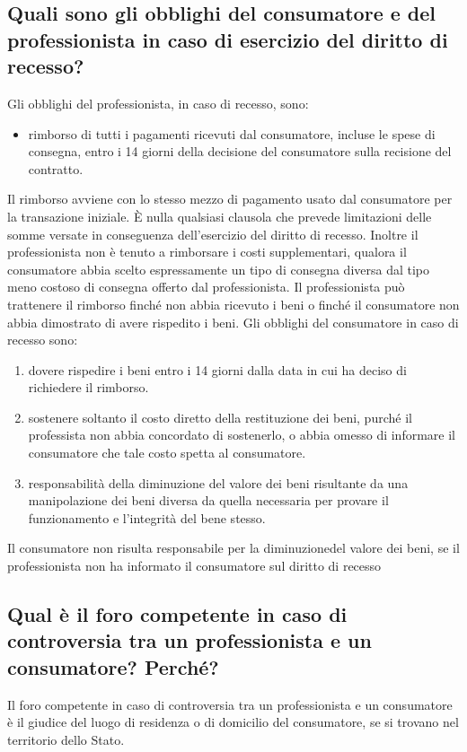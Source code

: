 \subsection{Quali sono gli obblighi del consumatore e del professionista in caso di
esercizio del diritto di recesso?}
Gli obblighi del professionista, in caso di recesso, sono:
\begin{itemize}
    \item rimborso di tutti i pagamenti ricevuti dal consumatore, incluse le spese di
        consegna, entro i 14 giorni della decisione del consumatore sulla recisione del
        contratto.
\end{itemize}
Il rimborso avviene con lo stesso mezzo di pagamento usato dal consumatore per la
transazione iniziale.
È nulla qualsiasi clausola che prevede limitazioni delle somme versate in conseguenza
dell'esercizio del diritto di recesso.
Inoltre il professionista non è tenuto a rimborsare i costi supplementari, qualora il
consumatore abbia scelto espressamente un tipo di consegna diversa dal tipo meno costoso
di consegna offerto dal professionista.
Il professionista può trattenere il rimborso finché non abbia ricevuto i beni o finché il
consumatore non abbia dimostrato di avere rispedito i beni.
\newline
\newline
Gli obblighi del consumatore in caso di recesso sono:
\begin{enumerate}
    \item dovere rispedire i beni entro i 14 giorni dalla data in cui ha deciso di richiedere il rimborso.
    \item sostenere soltanto il costo diretto della restituzione dei beni, purché il
        professista non abbia concordato di sostenerlo, o abbia omesso di informare il
        consumatore che tale costo spetta al consumatore.
    \item responsabilità della diminuzione del valore dei beni risultante da una
        manipolazione dei beni diversa da quella necessaria per provare il funzionamento e
        l'integrità del bene stesso.
\end{enumerate}
Il consumatore non risulta responsabile per la diminuzionedel valore dei beni, se il
professionista non ha informato il consumatore sul diritto di recesso

\subsection{Qual è il foro competente in caso di controversia tra un professionista e un consumatore?
Perché?}
Il foro competente in caso di controversia tra un professionista e un consumatore è il
giudice del luogo di residenza o di domicilio del consumatore, se si trovano nel
territorio dello Stato.

